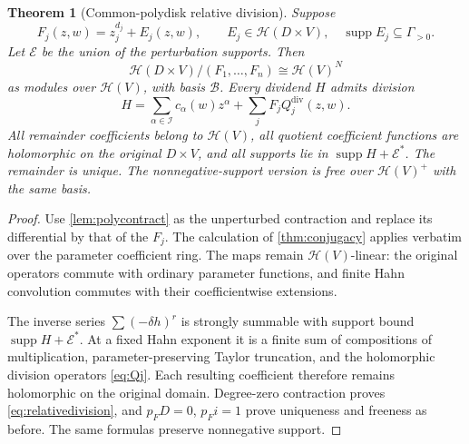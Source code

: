 \documentclass[11pt,letterpaper]{article}
\newtheorem{theorem}{Theorem}[section]
\theoremstyle{definition}
\theoremstyle{remark}
\newcommand{\HH}{\mathscr H}
\newcommand{\EE}{\mathcal E}
\newcommand{\supp}{\operatorname{supp}}
\numberwithin{equation}{section}
\begin{document}
\begin{theorem}[Common-polydisk relative division]\label{thm:polydisk}
Suppose
\[
 F_j(z,w)=z_j^{d_j}+E_j(z,w),\qquad
 E_j\in\HH(D\times V),\quad \supp E_j\subseteq\Gamma_{>0}.
\]
Let $\EE$ be the union of the perturbation supports. Then
\begin{equation}\label{eq:relative}
 \HH(D\times V)/(F_1,\ldots,F_n)
 \cong\HH(V)^N
\end{equation}
as modules over $\HH(V)$, with basis $\mathcal B$. Every dividend $H$ admits division
\begin{equation}\label{eq:relativedivision}
 H=\sum_{\alpha\in\mathcal I}c_\alpha(w)z^\alpha
       +\sum_j F_jQ_j^{\mathrm{div}}(z,w).
\end{equation}
All remainder coefficients belong to $\HH(V)$, all quotient coefficient functions are holomorphic on the original $D\times V$, and all supports lie in $\supp H+\EE^*$. The remainder is unique. The nonnegative-support version is free over $\HH(V)^+$ with the same basis.
\end{theorem}
\begin{proof}
Use \cref{lem:polycontract} as the unperturbed contraction and replace its differential by that of the $F_j$. The calculation of \cref{thm:conjugacy} applies verbatim over the parameter coefficient ring. The maps remain $\HH(V)$-linear: the original operators commute with ordinary parameter functions, and finite Hahn convolution commutes with their coefficientwise extensions.

The inverse series $\sum(-\delta h)^r$ is strongly summable with support bound $\supp H+\EE^*$. At a fixed Hahn exponent it is a finite sum of compositions of multiplication, parameter-preserving Taylor truncation, and the holomorphic division operators \eqref{eq:Qj}. Each resulting coefficient therefore remains holomorphic on the original domain. Degree-zero contraction proves \eqref{eq:relativedivision}, and $p_FD=0$, $p_Fi=1$ prove uniqueness and freeness as before. The same formulas preserve nonnegative support.
\end{proof}
\end{document}
